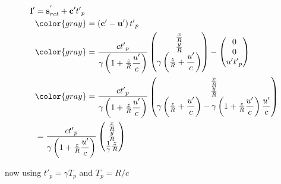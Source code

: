 \begin{equation}
	\begin{split}
		\mathbf{l}{'}
		 & = \mathbf{s}_{ret}^{'} + \mathbf{c}{'}t{'}_{p}
		\\
		 & \color{gray} = \left( \mathbf{c}{'}-\mathbf{u'} \right)t{'}_{p}
		\\
		 & \color{gray} = \dfrac{{c}t{'}_{p}}{{\gamma}\left(1 + \frac{z}{R} \dfrac{u'}{c} \right)}
		\begin{pmatrix}
			\frac{x}{R}                                        \\
			\frac{y}{R}                                        \\
			{\gamma} \left( \frac{z}{R} + \dfrac{u'}{c} \right) \\
		\end{pmatrix}
		-
		\begin{pmatrix}
			0            \\
			0            \\
			u' {t{'}_{p}} \\
		\end{pmatrix}
		\\
		 & \color{gray} = \dfrac{{c}t{'}_{p}}{{\gamma}\left(1 + \frac{z}{R} \dfrac{u'}{c} \right)}
		\begin{pmatrix}
			\frac{x}{R}                                                                                                                     \\
			\frac{y}{R}                                                                                                                     \\
			{\gamma} \left( \frac{z}{R} + \dfrac{u'}{c} \right)-{\gamma}\left(1 + \frac{z}{R} \dfrac{u'}{c} \right) \dfrac{u'}{c} \\
		\end{pmatrix}
		\\
		 & = \dfrac{{c}t{'}_{p}}{{\gamma}\left(1 + \frac{z}{R} \dfrac{u'}{c} \right)}
		\begin{pmatrix}
			\frac{x}{R}                    \\
			\frac{y}{R}                    \\
			\frac{1}{{\gamma}} \frac{z}{R} \\
		\end{pmatrix}
	\end{split}
\end{equation}

now using $ t{'}_{p} = {\gamma} {T}_{p}$ and ${T}_{p}= R / c$

